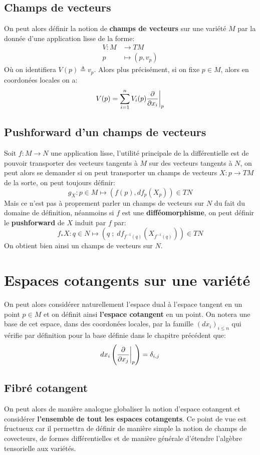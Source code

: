 \section{Champs de vecteurs}
On peut alors définir la notion de \textbf{champs de vecteurs} sur une variété \( M \) par la donnée d'une application lisse de la forme:
\[ 
   \begin{aligned}
      V : M &\longrightarrow TM \\
      p &\longmapsto (p, v_p)
   \end{aligned} 
\]
Où on identifiera \( V(p) \triangleq v_p \). Alors plus précisément, si on fixe \( p \in M \), alors en coordonées locales on a:
\[ 
   V(p) = \sum_{i = 1}^n V_i(p) \frac{\partial }{\partial x_i}\biggr|_p
\]
\pagebreak

\section{Pushforward d'un champs de vecteurs}
Soit \( f : M \longrightarrow N \) une application lisse, l'utilité principale de la différentielle est de pouvoir transporter des vecteurs tangents à \( M \) sur des vecteurs tangents à \( N \), on peut alors se demander si on peut transporter un champs de vecteurs \( X : p \longrightarrow TM \) de la sorte, on peut toujours définir:
\[ 
   g_X : p \in M \longmapsto (f(p), df_p(X_p)) \in TN
\]
Mais ce n'est pas à proprement parler un champs de vecteurs sur \( N \) du fait du domaine de définition, néanmoins si \( f \) est une \textbf{difféomorphisme}, on peut définir le \textbf{pushforward} de \( X \) induit par \( f \) par:
\[ 
   f_*X : q \in N \longmapsto (q \; ; \; df_{f^{-1}(q)}(X_{f^{-1}(q)})) \in TN
\]
On obtient bien ainsi un champs de vecteurs sur \( N \).
\chapter{Espaces cotangents sur une variété}
On peut alors considérer naturellement l'espace dual à l'espace tangent en un point \( p \in M \) et on définit ainsi \textbf{l'espace cotangent} en un point. On notera une base de cet espace, dans des coordonées locales, par la famille \( (dx_i)_{i \leq n} \) qui vérifie par définition pour la base définie dans le chapitre précédent que:
\[ 
   dx_i\left(\frac{\partial }{\partial x_j}\biggr|_p\right) = \delta_{i, j}
\]
\section{Fibré cotangent}
On peut alors de manière analogue globaliser la notion d'espace cotangent et considérer \textbf{l'ensemble de tout les espaces cotangents}. Ce point de vue est fructueux car il permettra de définir de manière simple la notion de champs de covecteurs, de formes différentielles et de manière générale d'étendre l'algèbre tensorielle aux variétés.\< 

